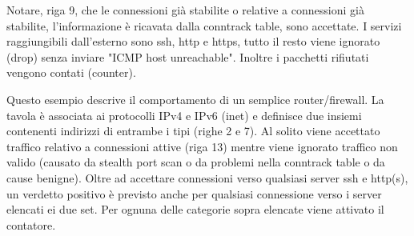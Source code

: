 \noindent Notare, riga 9, che le connessioni già stabilite o relative a
connessioni già stabilite, l'informazione è ricavata dalla conntrack table,
sono accettate.
I servizi raggiungibili dall'esterno sono ssh, http e https, tutto il resto
viene ignorato (drop) senza inviare "ICMP host unreachable". Inoltre i
pacchetti rifiutati vengono contati (counter).



\noindent Questo esempio descrive il comportamento di un semplice
router/firewall. La tavola è associata ai protocolli IPv4 e IPv6 (inet) e
definisce due insiemi contenenti indirizzi di entrambe i tipi (righe 2 e 7).
Al solito viene accettato traffico relativo a connessioni attive (riga 13)
mentre viene ignorato traffico non valido (causato da stealth port scan o da
problemi nella conntrack table o da cause benigne).
Oltre ad accettare connessioni verso qualsiasi server ssh e http(s), un
verdetto positivo è previsto anche per qualsiasi connessione verso i server
elencati ei due set.
Per ognuna delle categorie sopra elencate viene attivato il contatore.


\chapter{}
